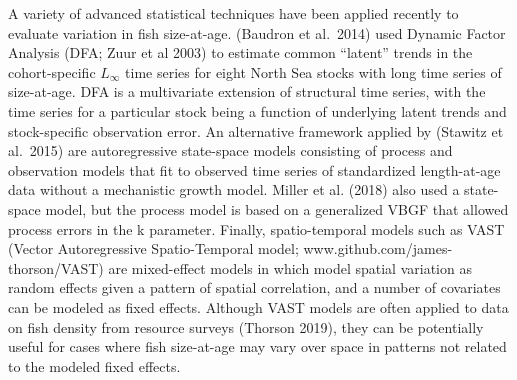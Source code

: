 \documentclass[]{article}
\begin{document}
A variety of advanced statistical techniques have been applied recently
to evaluate variation in fish size-at-age. (Baudron et al.~2014) used
Dynamic Factor Analysis (DFA; Zuur et al 2003) to estimate common
``latent'' trends in the cohort-specific \(L_\infty\) time series for
eight North Sea stocks with long time series of size-at-age. DFA is a
multivariate extension of structural time series, with the time series
for a particular stock being a function of underlying latent trends and
stock-specific observation error. An alternative framework applied by
(Stawitz et al.~2015) are autoregressive state-space models consisting
of process and observation models that fit to observed time series of
standardized length-at-age data without a mechanistic growth model.
Miller et al. (2018) also used a state-space model, but the process
model is based on a generalized VBGF that allowed process errors in the
k parameter. Finally, spatio-temporal models such as VAST (Vector
Autoregressive Spatio-Temporal model; www.github.com/james-thorson/VAST)
are mixed-effect models in which model spatial variation as random
effects given a pattern of spatial correlation, and a number of
covariates can be modeled as fixed effects. Although VAST models are
often applied to data on fish density from resource surveys (Thorson
2019), they can be potentially useful for cases where fish size-at-age
may vary over space in patterns not related to the modeled fixed
effects.
\end{document}
